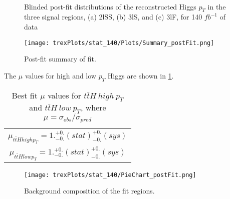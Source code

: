 \begin{figure}[h!]
    \\
    \caption{Blinded post-fit distributions of the reconstructed Higgs $p_T$ in the three signal regions, (a) 2lSS, (b) 3lS, and (c) 3lF, for 140 $fb^{-1}$ of data}
    \label{fig:sigRegions140}
\end{figure}

\begin{figure}[h!]
    \center
    \texttt{[image: trexPlots/stat\_140/Plots/Summary\_postFit.png]}
    \caption{Post-fit summary of fit.}
    \label{fig:Summary140}
\end{figure}

The $\mu$ values for high and low $p_T$ Higgs are shown in \ref{tab:mu140}.

\begin{table}[H]
  \centering
  \begin{tabular}{c}
     $\mu_{t\bar{t}H high p_T} = 1.^{+0.}_{-0.}(stat)^{+0.}_{-0.}(sys)$ \\
     $\mu_{t\bar{t}H low p_T} = 1.^{+0.}_{-0.}(stat)^{+0.}_{-0.}(sys)$ \\
  \end{tabular}
  \caption{Best fit $\mu$ values for $t\bar{t}H\ high\ p_T$ and  $t\bar{t}H\ low\ p_T$, where $\mu = \sigma_{obs}/\sigma_{pred}$} 
  \label{tab:mu140}
\end{table}

\begin{figure}[h!]
    \centering                                                                                                               
    \texttt{[image: trexPlots/stat\_140/PieChart\_postFit.png]}
    \caption{Background composition of the fit regions.}
    \label{fig:pieChart140}
\end{figure}

